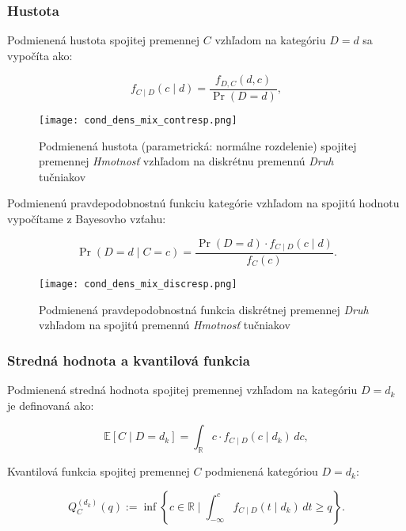 \subsubsection{Hustota}

Podmienená hustota spojitej premennej $C$ vzhľadom na kategóriu $D=d$ sa vypočíta ako:

\begin{equation}
f_{C \mid D}(c \mid d) = \frac{f_{D,C}(d, c)}{\Pr(D = d)},
\end{equation}

\begin{figure}[H]
    \centering
    \texttt{[image: cond\_dens\_mix\_contresp.png]}
    \caption{Podmienená hustota (parametrická: normálne rozdelenie) spojitej premennej \textit{Hmotnosť} vzhľadom na diskrétnu premennú \textit{Druh} tučniakov}
    \label{fig:cond_dens_mix_contresp}
\end{figure}

Podmienenú pravdepodobnostnú funkciu kategórie vzhľadom na spojitú hodnotu vypočítame z Bayesovho vzťahu:

\begin{equation}
\Pr(D = d \mid C = c) = \frac{\Pr(D = d) \cdot f_{C \mid D}(c \mid d)}{f_C(c)}.
\end{equation}

\begin{figure}[H]
    \centering
    \texttt{[image: cond\_dens\_mix\_discresp.png]}
    \caption{Podmienená pravdepodobnostná funkcia diskrétnej premennej \textit{Druh} vzhľadom na spojitú premennú \textit{Hmotnosť} tučniakov}
    \label{fig:cond_dens_mix_contresp}
\end{figure}

\subsubsection{Stredná hodnota a kvantilová funkcia}

Podmienená stredná hodnota spojitej premennej vzhľadom na kategóriu $D = d_k$ je definovaná ako:

\begin{equation}
\mathbb{E}[C \mid D = d_k] = \int_{\mathbb{R}} c \cdot f_{C \mid D}(c \mid d_k) \, dc,
\end{equation}

Kvantilová funkcia spojitej premennej $C$ podmienená kategóriou $D = d_k$:

\begin{equation}
Q_C^{(d_k)}(q) := \inf \left\{ c \in \mathbb{R} \mid \int_{-\infty}^c f_{C \mid D}(t \mid d_k) \, dt \geq q \right\}.
\end{equation}

